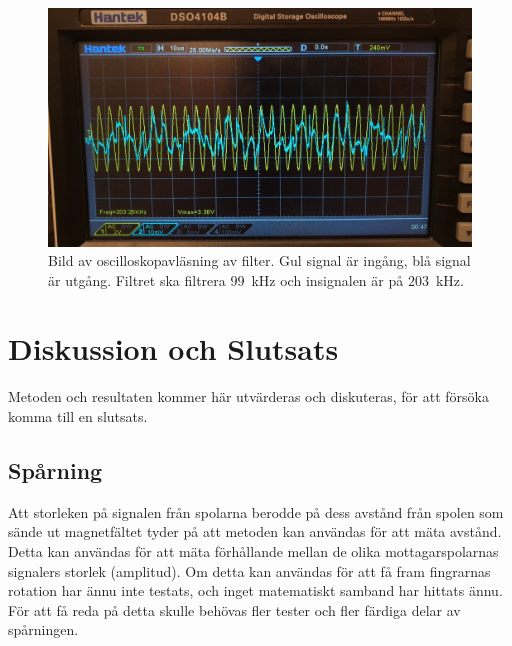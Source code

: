 \documentclass[a4paper]{article}
\begin{document}
\begin{sloppypar}
    \begin{figure}
        \centering
        \includegraphics[width=\textwidth]{Filter-200kHz.jpg}
        \caption{Bild av oscilloskopavläsning av filter. Gul signal är ingång, blå signal är utgång. Filtret ska filtrera $99$~kHz och insignalen är på $203$~kHz.}
        \label{fig:signal-99kHz-Filter-200kHz}
    \end{figure}

    \newpage
    \section{Diskussion och Slutsats}
    Metoden och resultaten kommer här utvärderas och diskuteras, för att försöka komma till en slutsats.

    \subsection{Spårning}
    Att storleken på signalen från spolarna berodde på dess avstånd från spolen som sände ut magnetfältet tyder på att metoden kan användas för att mäta avstånd. Detta kan användas för att mäta förhållande mellan de olika mottagarspolarnas signalers storlek (amplitud). Om detta kan användas för att få fram fingrarnas rotation har ännu inte testats, och inget matematiskt samband har hittats ännu. För att få reda på detta skulle behövas fler tester och fler färdiga delar av spårningen.

\end{sloppypar}
\end{document}
